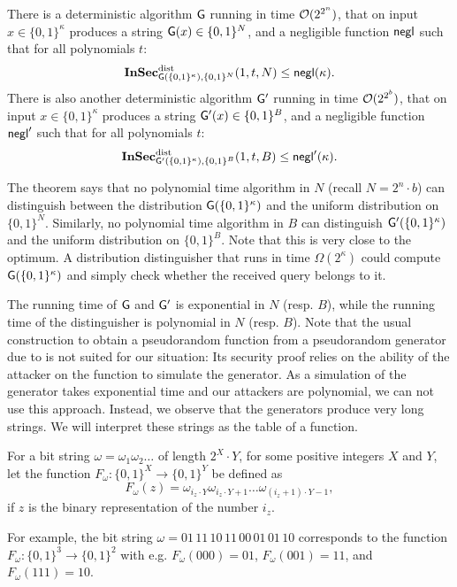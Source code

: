 \begin{theorem}
\label{thm:goldreich_gen}
There is a deterministic algorithm $\mathsf{G}$ running in time
$\mathcal{O}(2^{2^{n}})$, that on input $x\in \{0,1\}^{\kappa}$ produces a
string $\mathsf{G}(x)\in \{0,1\}^{N}$, and a negligible function $\operatorname{\mathsf{negl}}$
such that for all polynomials $t$:
\begin{align*}
  \operatorname{\mathbf{InSec}}^{\operatorname{dist}}_{\mathsf{G}(\{0,1\}^{\kappa}),\{0,1\}^{N}}(1,t,N)\leq \operatorname{\mathsf{negl}}(\kappa).  
\end{align*}
There is also another deterministic algorithm $\mathsf{G'}$ running in
time $\mathcal{O}(2^{2^{b}})$, that on input
$x\in \{0,1\}^{\kappa}$ produces a string $\mathsf{G'}(x)\in \{0,1\}^{B}$, and a
negligible function $\operatorname{\mathsf{negl}}'$ such that for all polynomials $t$:
\begin{align*}
  \operatorname{\mathbf{InSec}}^{\operatorname{dist}}_{\mathsf{G'}(\{0,1\}^{\kappa}),\{0,1\}^{B}}(1,t,B)\leq \operatorname{\mathsf{negl}}'(\kappa).
\end{align*}
\end{theorem}


The theorem says  that no polynomial time algorithm in $N$
(recall $N=2^{n}\cdot b$) can
distinguish between the distribution $\mathsf{G}(\{0,1\}^{\kappa})$ and the uniform
distribution on $\{0,1\}^{N}$. Similarly, no polynomial time algorithm
in $B$ can distinguish $\mathsf{G'}(\{0,1\}^{\kappa})$ and the uniform
distribution on $\{0,1\}^{B}$. Note that this is very close to the
optimum. A distribution distinguisher that runs in time
$\Omega(2^{\kappa})$ could compute $\mathsf{G}(\{0,1\}^{\kappa})$ and
simply check whether the received query belongs to it. 


The running
time of $\mathsf{G}$ and $\mathsf{G'}$ is exponential in $N$ (resp. $B$), while the running time of the
distinguisher is polynomial in $N$ (resp. $B$). 
Note that the usual construction to obtain a pseudorandom function from
a pseudorandom generator due to \citeauthor{goldreich1986construct}
\cite{goldreich1986construct} is not suited for our situation: Its security
proof relies on the ability of the attacker on the function to simulate
the generator. As a simulation of the generator takes exponential time
and our attackers are polynomial, we can not use this approach. Instead,
we observe that the generators produce very long strings. We will
interpret these strings as the table of a function.

For a bit string $\omega=\omega_{1}\omega_{2}\ldots$ of length
$2^{X}\cdot Y$, for some positive integers $X$ and $Y$,
let the function 
$F_{\omega}\colon \{0,1\}^{X}\to \{0,1\}^{Y}$
be defined as
\[F_{\omega}(z)=\omega_{i_{z}\cdot Y}\omega_{i_{z}\cdot Y+1}\ldots
  \omega_{(i_{z}+1)\cdot Y-1},\]
if $z$ is the binary representation of the number $i_{z}$.
\begin{example}
For example, the bit string $\omega=01\, 11\, 10\, 11\, 00\, 01\, 01\, 10$ corresponds
to the function $F_{\omega}\colon \{0,1\}^{3}\to \{0,1\}^{2}$ with
e.g. $F_{\omega}(000)=01$, $F_{\omega}(001)=11$, and
$F_{\omega}(111)=10$. 
\end{example}

